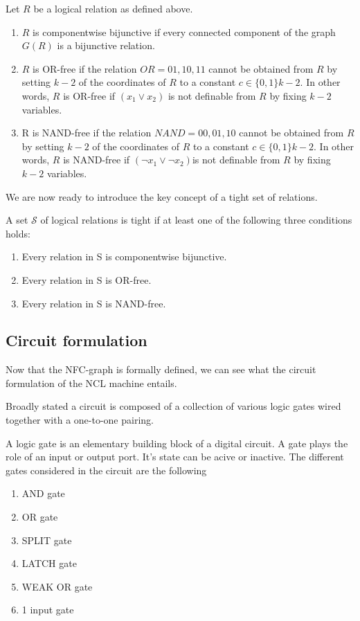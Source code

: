 \begin{defn}Let $R$ be a logical relation as defined above.
\begin{enumerate}
    \item $R$ is componentwise bijunctive if every connected component of the graph $G(R)$ is a bijunctive relation.
    \item $R$ is OR-free if the relation $OR = {01, 10, 11}$ cannot be obtained from $R$ by setting $k-2$ of the coordinates of $R$ to a constant $c \in \{0, 1\} k-2$. In other words, $R$ is OR-free if $(x_1 \vee x _2)$ is not definable from $R$ by fixing $k-2$ variables.
    \item R is NAND-free if the relation $NAND = {00, 01, 10}$ cannot be obtained from $R$ by setting $k-2$ of the coordinates of $R$ to a constant $c \in \{0, 1\} k-2$. In other words, $R$ is NAND-free if $(\neg x_1 \vee \neg x_2 ) $is not definable from $R$ by fixing $k-2$ variables.
\end{enumerate}
We are now ready to introduce the key concept of a tight set of relations.
\end{defn}

\begin{defn}
A set $\mathcal{S}$ of logical relations is tight if at least one of the following three conditions holds: 
\begin{enumerate}
    \item Every relation in S is componentwise bijunctive.
    \item Every relation in S is OR-free.
    \item Every relation in S is NAND-free.
\end{enumerate}
\end{defn}




\subsection{Circuit formulation}
Now that the NFC-graph is formally defined, we can see what the circuit formulation of the NCL machine entails.

\begin{defn}
Broadly stated a circuit is composed of a collection of various logic gates wired together with a one-to-one pairing. 
\end{defn}

\begin{defn}
A logic gate is an elementary building block of a digital circuit. A gate plays the role of an input or output port. It's state can be acive or inactive. The different gates considered in the circuit are the following
\begin{enumerate}
    \item AND gate 
    \item OR gate 
    \item SPLIT gate 
    \item LATCH gate 
    \item WEAK OR gate 
    \item 1 input gate 
\end{enumerate}
\end{defn}

